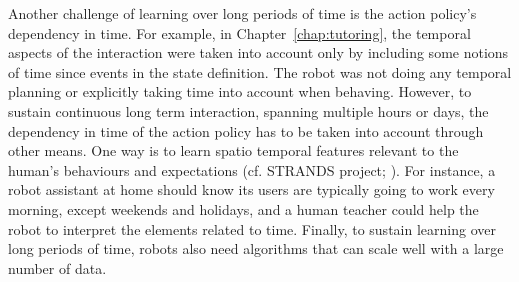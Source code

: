 Another challenge of learning over long periods of time is the action policy's dependency in time. For example, in Chapter~\ref{chap:tutoring}, the temporal aspects of the interaction were taken into account only by including some notions of time since events in the state definition. The robot was not doing any temporal planning or explicitly taking time into account when behaving. However, to sustain continuous long term interaction, spanning multiple hours or days, the dependency in time of the action policy has to be taken into account through other means. One way is to learn spatio temporal features relevant to the human's behaviours and expectations (cf. STRANDS project; \citealt{hawes2017strands}). For instance, a robot assistant at home should know its users are typically going to work every morning, except weekends and holidays, and a human teacher could help the robot to interpret the elements related to time. Finally, to sustain learning over long periods of time, robots also need algorithms that can scale well with a large number of data. 


